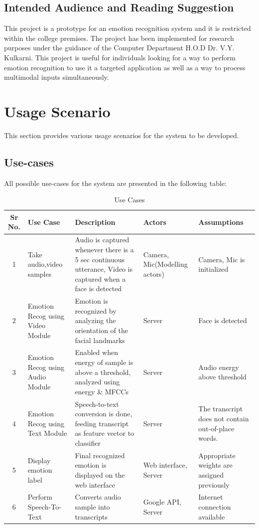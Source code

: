 \documentclass[oneside,a4paper,12pt]{report}
\begin{document}
\begin{normalsize}
\subsection{Intended Audience and Reading Suggestion}
\hspace{15mm}This project is a prototype for an emotion recognition system and it is restricted within the college premises. The project has been implemented for research purposes under the guidance of the Computer Department H.O.D Dr. V.Y. Kulkarni. This project is useful for individuals looking for a way to perform emotion recognition to use it a targeted application as well as a way to process multimodal inputs simultaneously.
\section{Usage Scenario}
This section provides various usage scenarios for the system to be developed.
\subsection{Use-cases}
All possible use-cases for the system are presented in the following table:
\begin{table}[!htbp]
\begin{center}
\def\arraystretch{1.5}
\begin{tabularx}{\textwidth}{| c | X | X | X | X |}
\hline
Sr No.	& Use Case	& Description	& Actors	& Assumptions \\
\hline
1 & Take audio,video samples & Audio is captured whenever there is a 5 sec continuous utterance, Video is captured when a face is detected & Camera, Mic(Modelling actors) & Camera, Mic is initialized \\
\hline
2 & Emotion Recog using Video Module & Emotion is recognized by analyzing the orientation of the facial landmarks & Server & Face is detected\\
\hline
3 & Emotion Recog using Audio Module & Enabled when energy of sample is above a threshold, analyzed using energy \& MFCCs & Server & Audio energy above threshold\\
\hline
4 & Emotion Recog using Text Module & Speech-to-text conversion is done, feeding transcript as feature vector to classifier & Server & The transcript does not contain out-of-place words.\\
\hline
5 & Display emotion label & Final recognized emotion is displayed on the web interface & Web interface, Server & Appropriate weights are assigned previously\\
\hline
6 & Perform Speech-To-Text & Converts audio sample into transcripts & Google API, Server & Internet connection available\\
\hline 
\end{tabularx}
\end{center}
\caption{Use Cases}
\label{tab:usecase}
\end{table}
\newpage

\end{normalsize}
\end{document}
